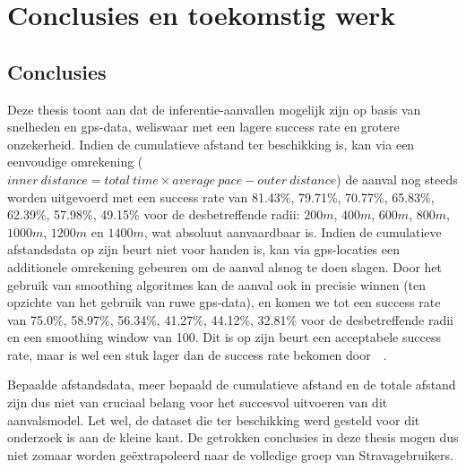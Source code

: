 \chapter{Conclusies en toekomstig werk}
\section{Conclusies}
Deze thesis toont aan dat de inferentie-aanvallen mogelijk zijn op basis van
snelheden en \ac{gps}-data, weliswaar met een lagere success rate en grotere
onzekerheid. Indien de cumulatieve afstand ter beschikking is, kan via een
eenvoudige omrekening ($inner\ distance = total\ time \times average\ pace -
      outer\ distance$) de aanval nog steeds worden uitgevoerd met een success rate
van 81.43\%, 79.71\%, 70.77\%, 65.83\%, 62.39\%, 57.98\%, 49.15\% voor de
desbetreffende radii: $200m$, $400m$, $600m$, $800m$, $1000m$, $1200m $ en
$1400m$, wat absoluut aanvaardbaar is. Indien de cumulatieve afstandsdata op
zijn beurt niet voor handen is, kan via \ac{gps}-locaties een additionele
omrekening gebeuren om de aanval alsnog te doen slagen. Door het gebruik van
smoothing algoritmes kan de aanval ook in precisie winnen (ten opzichte van het
gebruik van ruwe \ac{gps}-data), en komen we tot een success rate van 75.0\%,
58.97\%, 56.34\%, 41.27\%, 44.12\%, 32.81\% voor de desbetreffende radii en een
smoothing window van 100. Dit is op zijn beurt een acceptabele success rate,
maar is wel een stuk lager dan de success rate bekomen
door~\citeauthor{Dhondt}~\cite{Dhondt}.

Bepaalde afstandsdata, meer bepaald de cumulatieve afstand en de totale afstand
zijn dus niet van cruciaal belang voor het succesvol uitvoeren van dit
aanvalsmodel. Let wel, de dataset die ter beschikking werd gesteld voor dit
onderzoek is aan de kleine kant. De getrokken conclusies in deze thesis mogen
dus niet zomaar worden geëxtrapoleerd naar de volledige groep van
Stravagebruikers.

